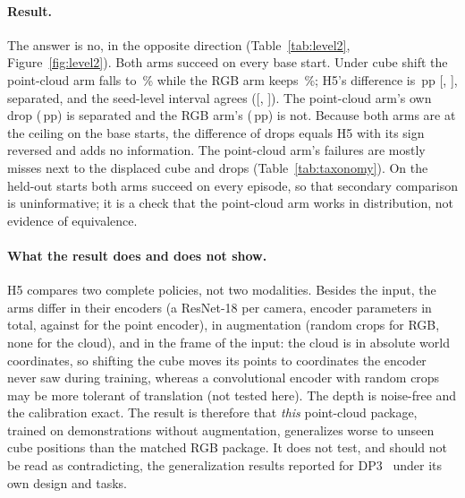 \paragraph{Result.} The answer is no, in the opposite direction
(Table~\ref{tab:level2}, Figure~\ref{fig:level2}). Both arms succeed on every base start.
Under cube shift the point-cloud arm falls to \,\% while the RGB arm
keeps \,\%; H5's difference is \,pp [,
], separated, and the seed-level interval agrees ([,
]). The point-cloud arm's own drop (\,pp) is separated
and the RGB arm's (\,pp) is not. Because both arms are at the ceiling on
the base starts, the difference of drops equals H5 with its sign reversed and adds no
information. The point-cloud arm's failures are mostly misses next to the displaced cube and drops
(Table~\ref{tab:taxonomy}). On the held-out starts both arms succeed on every episode, so that
secondary comparison is uninformative; it is a check that the point-cloud arm works in
distribution, not evidence of equivalence.

\paragraph{What the result does and does not show.} H5 compares two complete policies, not
two modalities. Besides the input, the arms differ in their encoders (a ResNet-18 per camera,
 encoder parameters in total, against  for the point
encoder), in augmentation (random crops for RGB, none for the cloud), and in the frame of the
input: the cloud is in absolute world coordinates, so shifting the cube moves its points to
coordinates the encoder never saw during training, whereas a convolutional encoder with
random crops may be more tolerant of translation (not tested here). The depth is noise-free and the calibration
exact. The result is therefore that \emph{this} point-cloud package, trained on
 demonstrations without augmentation, generalizes worse to unseen cube
positions than the matched RGB package. It does not test, and should not be read as
contradicting, the generalization results reported for DP3~\citep{ze2024dp3} under its own
design and tasks.
